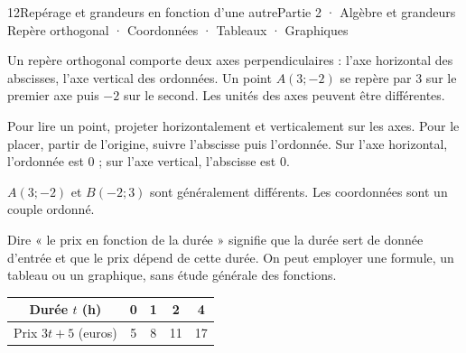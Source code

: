 \begin{ouverture}[geometrie]{12}{Repérage et grandeurs en fonction d’une autre}{Partie 2 · Algèbre et grandeurs}
{Repère orthogonal · Coordonnées · Tableaux · Graphiques}
\end{ouverture}
\pagestyle{otMain}\essentiel\fontsize{11}{15}\selectfont
{}\label{cours-12-1}
\begin{definition}Un repère orthogonal comporte deux axes perpendiculaires : l’axe horizontal des abscisses, l’axe vertical des ordonnées. Un point $A(3;-2)$ se repère par 3 sur le premier axe puis $-2$ sur le second. Les unités des axes peuvent être différentes.\end{definition}
\label{fig-cours-12-1-cours-repere}

\begin{savoirfaire}Pour lire un point, projeter horizontalement et verticalement sur les axes. Pour le placer, partir de l’origine, suivre l’abscisse puis l’ordonnée. Sur l’axe horizontal, l’ordonnée est 0 ; sur l’axe vertical, l’abscisse est 0.\end{savoirfaire}
\begin{attention}$A(3;-2)$ et $B(-2;3)$ sont généralement différents. Les coordonnées sont un couple ordonné.\end{attention}
\clearpage
{}\label{cours-12-2}
\begin{definition}Dire « le prix en fonction de la durée » signifie que la durée sert de donnée d’entrée et que le prix dépend de cette durée. On peut employer une formule, un tableau ou un graphique, sans étude générale des fonctions.\end{definition}
\begin{center}\renewcommand{\arraystretch}{1.35}\begin{tabular}{c|cccc}\toprule
Durée $t$ (h) & 0 & 1 & 2 & 4\\\midrule
Prix $3t+5$ (euros) & 5 & 8 & 11 & 17\\
\bottomrule\end{tabular}\end{center}
\label{fig-cours-12-2-cours-dependance}

